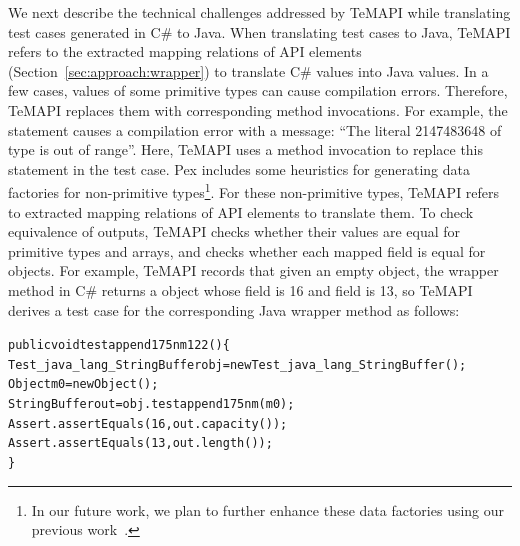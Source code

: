 
We next describe the technical challenges addressed by TeMAPI while translating test cases generated in C\# to Java. When translating test cases to Java, TeMAPI refers to the extracted mapping relations of API elements (Section~\ref{sec:approach:wrapper}) to translate C\# values into Java values. In a few cases, values of some primitive types can cause compilation errors. Therefore, TeMAPI replaces them with corresponding method invocations. For example, the  statement causes a compilation error with a message: ``The literal 2147483648 of type  is out of range''. Here, TeMAPI uses a method invocation to replace this statement in the  test case. Pex includes some heuristics for generating data factories for non-primitive types\footnote{In our future work, we plan to further enhance these data factories using our previous work~\cite{thummalapenta09:mseqgen}.}. For these non-primitive types, TeMAPI refers to extracted mapping relations of API elements to translate them. To check equivalence of outputs, TeMAPI checks whether their values are equal for primitive types and arrays, and checks whether each mapped field is equal for objects. For example, TeMAPI records that given an empty object, the  wrapper method in C\# returns a  object whose  field is 16 and  field is 13, so TeMAPI derives a test case for the corresponding Java wrapper method as follows:

\begin{CodeOut}%
\begin{alltt}
public void testappend175nm122()\{
  Test_java_lang_StringBuffer obj = new Test_java_lang_StringBuffer();
  Object m0 = new Object();
  StringBuffer out = obj.testappend175nm(m0);
  Assert.assertEquals(16, out.capacity());	
  Assert.assertEquals(13, out.length());
\}
\end{alltt}
\end{CodeOut}%

